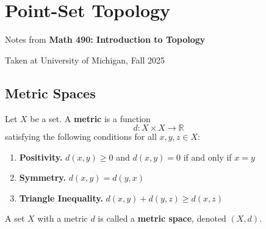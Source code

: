 \section{Point-Set Topology}

\begin{center}
    Notes from \textbf{Math 490: Introduction to Topology}

    Taken at University of Michigan, Fall 2025
\end{center}

\subsection{Metric Spaces}

\begin{framed}
\begin{defn}
    Let $X$ be a set. A \textbf{metric} is a function \[d:X\times X\to\mathbb{R}\] satisfying the following conditions for all $x,y,z\in X$:
    \begin{enumerate}
        \item[]\textbf{Positivity.} $d(x,y)\geq 0$ and $d(x,y)=0$ if and only if $x=y$
        \item[]\textbf{Symmetry.} $d(x,y) = d(y,x)$
        \item[]\textbf{Triangle Inequality.} $d(x,y)+d(y,z) \geq d(x,z)$
    \end{enumerate}
    A set $X$ with a metric $d$ is called a \textbf{metric space}, denoted $(X,d)$.
\end{defn}
\end{framed}

